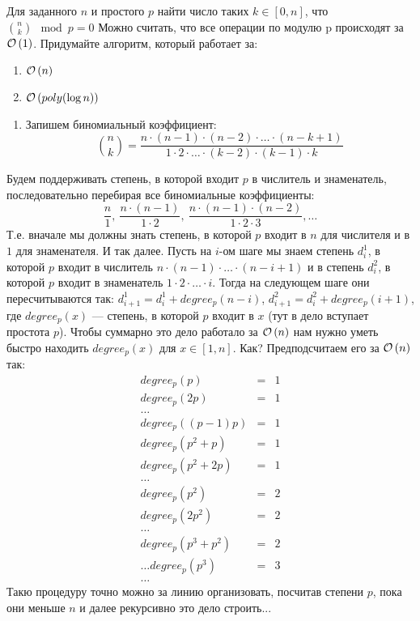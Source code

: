 \begin{task}[2]
Для заданного $n$ и простого $p$ найти число таких $k \in [0, n]$, что ${n \choose k} \mod{p} = 0$
Можно считать, что все операции по модулю p происходят за $\mathcal{O}\left(1\right)$. Придумайте алгоритм, который работает за:
	\begin{enumerate}[label=(\alph*)]
		\item $\mathcal{O}\left(n\right)$
		\item $\mathcal{O}\left(poly{(\log{n})}\right)$
	\end{enumerate}
\end{task}
\begin{solution}

\begin{enumerate}[label=(\alph*)]
	\item Запишем биномиальный коэффициент: 
	\[ 
		{n \choose k} = \frac{n\cdot(n-1)\cdot(n-2)\cdot \ldots \cdot (n-k+1)}{1\cdot2\cdot\ldots\cdot(k-2)\cdot(k-1)\cdot k}
	\]
\end{enumerate}
Будем поддерживать степень, в которой входит $p$ в числитель и знаменатель, последовательно перебирая все биномиальные коэффициенты:
\[
	\frac{n}{1},\ \frac{n\cdot(n-1)}{1\cdot2},\ \frac{n\cdot(n-1)\cdot(n-2)}{1\cdot2\cdot3}, \ldots
\]
Т.е. вначале мы должны знать степень, в которой $p$ входит в $n$ для числителя и в $1$ для знаменателя. И так далее. Пусть на $i$-ом шаге мы знаем степень $d^1_i$, в которой $p$ входит в числитель $n\cdot(n-1)\cdot\ldots\cdot(n-i+1)$ и в степень $d^2_i$, в которой $p$ входит в знаменатель $1\cdot2\cdot\ldots \cdot i$. Тогда на следующем шаге они пересчитываются так: $d^1_{i+1} = d^1_i + degree_p(n - i)$, $d^2_{i+1} = d^2_i + degree_p(i + 1)$, где $degree_p(x)$ --- степень, в которой $p$ входит в $x$ (тут в дело вступает простота $p$). Чтобы суммарно это дело работало за $\mathcal{O}\left(n\right)$ нам нужно уметь быстро находить $degree_p(x)$ для $x \in [1, n]$. Как? Предподсчитаем его за $\mathcal{O}\left(n\right)$ так:
\[
	\begin{array}{lcl}
		degree_p(p)  & = & 1\\
		degree_p(2p) & = & 1\\
		\ldots\\
		degree_p((p-1)p) & = & 1\\
		degree_p(p^2 + p) & = & 1 \\
		degree_p(p^2 + 2p) & = & 1 \\
		\ldots\\
		degree_p(p^2) & = & 2 \\
		degree_p(2p^2) & = & 2 \\
		\ldots\\
		degree_p(p^3 + p^2) & = & 2\\
		\ldots
		degree_p(p^3) & = & 3\\
		\ldots
	\end{array}
\] 
Такю процедуру точно можно за линию организовать, посчитав степени $p$, пока они меньше $n$ и далее рекурсивно это дело строить...
\xqed
\end{solution}





